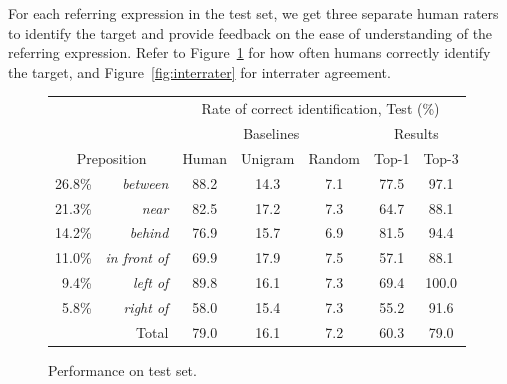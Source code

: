 \documentclass[conference]{IEEEtran}
\numberwithin{equation}{section}
\begin{document}
For each referring expression in the test set, we get three separate human raters to identify the target and provide feedback on the ease of understanding of the referring expression. Refer to Figure~\ref{fig:results} for how often humans correctly identify the target, and Figure~\ref{fig:interrater} for interrater agreement.  

\begin{figure}[!b]
  \centering
  \begin{tabular}{| r r | c | c | c || c c |} \hline
     & & \multicolumn{5}{c|}{Rate of correct identification, Test (\%)} \\
     & & \multicolumn{3}{c||}{Baselines} & \multicolumn{2}{c|}{Results} \\
     \multicolumn{2}{|c|}{Preposition}
			                      &   Human & Unigram & Random &  Top-1 & Top-3 \\\hline
26.8\% & \textit{between}       & 88.2  & 14.3  & 7.1   & 77.5  & 97.1 \\
21.3\% & \textit{near}          & 82.5  & 17.2  & 7.3   & 64.7  & 88.1 \\
14.2\% & \textit{behind}        & 76.9  & 15.7  & 6.9   & 81.5  & 94.4 \\
11.0\% & \textit{in front of}   & 69.9  & 17.9  & 7.5   & 57.1  & 88.1 \\
9.4\% & \textit{left of}        & 89.8  & 16.1  & 7.3   & 69.4  & 100.0 \\
5.8\% & \textit{right of}       & 58.0  & 15.4  & 7.3   & 55.2  & 91.6 \\\hline\hline
    \multicolumn{2}{|r|}{Total} & 79.0  & 16.1  & 7.2   & 60.3  & 79.0 \\\hline
  \end{tabular}
  \caption{Performance on test set.}
  \label{fig:results}
\end{figure}
\end{document}
